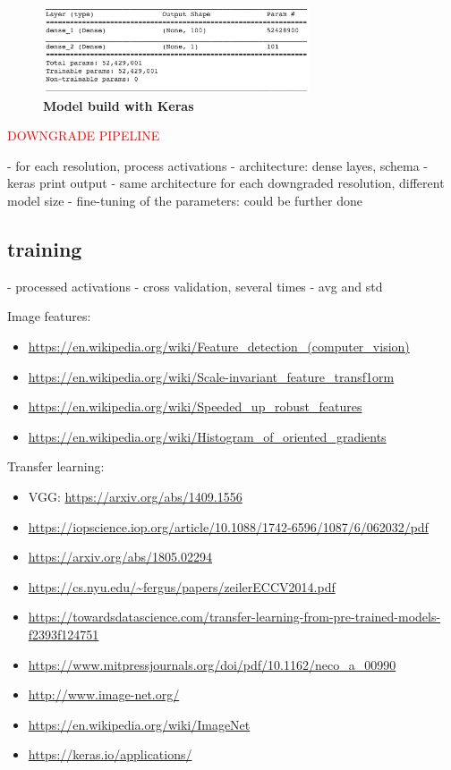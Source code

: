 \begin{figure}[h!]
	\centering
	\includegraphics[width=0.7\textwidth]{Figures/model_keras.png}
	\captionsetup{width=1\linewidth}
	\caption{\textbf{Model build with Keras}}
	\label{fig:model_keras}
\end{figure}

\textcolor{red}{DOWNGRADE PIPELINE}

- for each resolution, process activations
- architecture: dense layes, schema
- keras print output
- same architecture for each downgraded resolution, different model size
- fine-tuning of the parameters: could be further done

\subsection{training}

- processed activations
- cross validation, several times
- avg and std


Image features:

\begin{itemize}
	\item \url{https://en.wikipedia.org/wiki/Feature_detection_(computer_vision)}
	\item \url{https://en.wikipedia.org/wiki/Scale-invariant_feature_transf1orm}
	\item \url{https://en.wikipedia.org/wiki/Speeded_up_robust_features}
	\item \url{https://en.wikipedia.org/wiki/Histogram_of_oriented_gradients}
\end{itemize}

Transfer learning: 

\begin{itemize}
	\item VGG: \url{https://arxiv.org/abs/1409.1556}
	\item \url{https://iopscience.iop.org/article/10.1088/1742-6596/1087/6/062032/pdf}
	\item \url{https://arxiv.org/abs/1805.02294}
	\item \url{https://cs.nyu.edu/~fergus/papers/zeilerECCV2014.pdf}
	\item \url{https://towardsdatascience.com/transfer-learning-from-pre-trained-models-f2393f124751}
	\item \url{https://www.mitpressjournals.org/doi/pdf/10.1162/neco_a_00990}
	\item \url{http://www.image-net.org/}
	\item \url{https://en.wikipedia.org/wiki/ImageNet}
	\item \url{https://keras.io/applications/}
\end{itemize}

